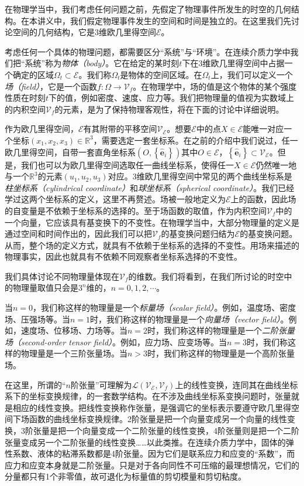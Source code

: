\documentclass[../main.tex]{subfiles}
\begin{document}
在物理学当中，我们考虑任何问题之前，先假定了物理事件所发生的时空的几何结构。在本讲义中，我们假定物理事件发生的空间和时间是独立的。在这里我们先讨论空间的几何结构，它是3维欧几里得空间$\mathcal{E}$。

考虑任何一个具体的物理问题，都需要区分“系统”与“环境”。在连续介质力学中我们把“系统”称为\emph{物体（body）}。它在给定的某时刻$t$下在3维欧几里得空间中占据一个确定的区域$\Omega_t\subset\mathcal{E}$。我们称$\Omega_t$是物体的空间区域。在$\Omega_t$上，我们可以定义一个\emph{场（field）}，它是一个函数$f:\Omega\rightarrow\mathcal{V}_f$。在物理学中，场的值是这个物体的某个强度性质在时刻$t$下的值，例如密度、速度、应力等。我们把物理量的值视为实数域上的内积空间$\mathcal{V}_f$的元素，是为了保持物理客观性，将在下面的讨论中详细说明。

作为欧几里得空间，$\mathcal{E}$有其附带的平移空间$\mathcal{V}_\mathcal{E}$。想要$\mathcal{E}$中的点$X\in \mathcal{E}$能唯一对应一个坐标$\left(x_1,x_2,x_3\right)\in\mathbb{R}^3$，需要选定一套坐标系。在之前的介绍中我们说过，任一欧几里得空间，自带一套直角坐标系$\left(O,\left\{\mathbf{\hat{e}}_i\right\}\right)$其中$O\in\mathcal{E}$，$\left\{\mathbf{\hat{e}}_i\right\}\subset\mathcal{V}_\mathcal{E}$。但是，我们也可以为欧几里得空间选取任一曲线坐标系，使得任一$X\in\mathcal{E}$仍然唯一地与一个$\mathbb{R}^3$的元素$\left(u_1,u_2,u_3\right)$对应。3维欧几里得空间中常见的两个曲线坐标系是\emph{柱坐标系（cylindrical coordinate）}和\emph{球坐标系（spherical coordinate）}。我们已经学过这两个坐标系的定义，这里不再赘述。场被一般地定义为$\mathcal{E}$上的函数，因此场的自变量是不依赖于坐标系的选择的。至于场函数的取值，作为内积空间$\mathcal{V}_f$中的一个向量，它应该具有基变换下的不变性。在物理学当中，大部分物理量的定义是通过空间和时间作出的，因此我们可以把$\mathcal{V}_f$的基变换问题归结为$\mathcal{E}$的基变换问题。从而，整个场的定义方式，就具有不依赖于坐标系的选择的不变性。用场来描述的物理事实，因此也就具有不依赖不同观察者坐标系选择的不变性。

我们具体讨论不同物理量体现在$\mathcal{V}_f$的维数。我们将看到，在我们所讨论的时空中的物理量取值只会是$3^n$维的，$n=0,1,2,\cdots$。

当$n=0$，我们称这样的物理量是一个\emph{标量场（scalar field）}。例如，温度场、密度场、压强场等。当$n=1$时，我们称这样的物理量是一个\emph{向量场（vector field）}。例如，速度场、位移场、力场等。当$n=2$时，我们称这样的物理量是一个\emph{二阶张量场（second-order tensor field）}。例如，应力场、应变场等。当$n=3$时，我们称这样的物理量是一个三阶张量场。当$n>3$时，我们称这样的物理量是一个高阶张量场。

在这里，所谓的“$n$阶张量”可理解为$\mathcal{L}\left(\mathcal{V}_\mathcal{E},\mathcal{V}_f\right)$上的线性变换，连同其在曲线坐标系下的坐标变换规律，的一套数学结构。在不涉及曲线坐标系变换问题时，张量就是相应的线性变换。把线性变换称作张量，是强调它的坐标表示要遵守欧几里得空间下场函数的曲线坐标变换规律。2阶张量是把一个向量变成另一个向量的线性变换，3阶张量是把一个向量变成一个二阶张量的线性变换，4阶张量则是把一个二阶张量变成另一个二阶张量的线性变换……以此类推。在连续介质力学中，固体的弹性系数、液体的粘滞系数都是4阶张量。因为它们是联系应力和应变的“系数”，而应力和应变本身就是二阶张量。只是对于各向同性不可压缩的最理想情况，它们的分量都只有1个非零值，故可退化为标量值的剪切模量和剪切粘度。
\end{document}

